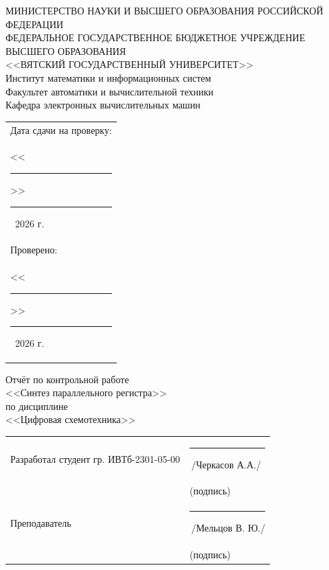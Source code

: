 \documentclass[oneside,a4paper,14pt]{extarticle}
\begin{document}
\newpage
\thispagestyle{empty}
\begin{center}
  МИНИСТЕРСТВО НАУКИ И ВЫСШЕГО ОБРАЗОВАНИЯ РОССИЙСКОЙ ФЕДЕРАЦИИ\\
  ФЕДЕРАЛЬНОЕ ГОСУДАРСТВЕННОЕ БЮДЖЕТНОЕ УЧРЕЖДЕНИЕ ВЫСШЕГО ОБРАЗОВАНИЯ\\
  <<ВЯТСКИЙ ГОСУДАРСТВЕННЫЙ УНИВЕРСИТЕТ>>\\
  Институт математики и информационных систем\\
  Факультет автоматики и вычислительной техники\\
  Кафедра электронных вычислительных машин
\end{center}
\vspace{10mm}

\hfill
\begin{tabular}{l}
  \footnotesize Дата сдачи на проверку:                                          \\
  \footnotesize <<\rule[-1mm]{5mm}{0.10mm}\/>>\rule[-1mm]{20mm}{0.10mm}\ 2026 г. \\
  \footnotesize Проверено:                                                       \\
  \footnotesize <<\rule[-1mm]{5mm}{0.10mm}\/>>\rule[-1mm]{20mm}{0.10mm}\ 2026 г. \\
\end{tabular}
\vfill

\begin{center}
  Отчёт по контрольной работе\\
  <<Синтез параллельного регистра>>\\
  по дисциплине\\
  <<Цифровая схемотехника>>\\
\end{center}
\vspace{25mm}
\noindent
\begin{tabular}{ll}
  Разработал студент гр. ИВТб-2301-05-00 & \hspace{20mm}\rule[-1mm]{30mm}{0.10mm}\,/Черкасов А.А./ \\
                                 & \hspace{27.5mm}\footnotesize(подпись)                   \\
  Преподаватель                  & \hspace{20mm}\rule[-1mm]{30mm}{0.10mm}\,/Мельцов В. Ю./  \\
                                 & \hspace{27.5mm}\footnotesize(подпись)                   \\
\end{tabular}
\end{document}
